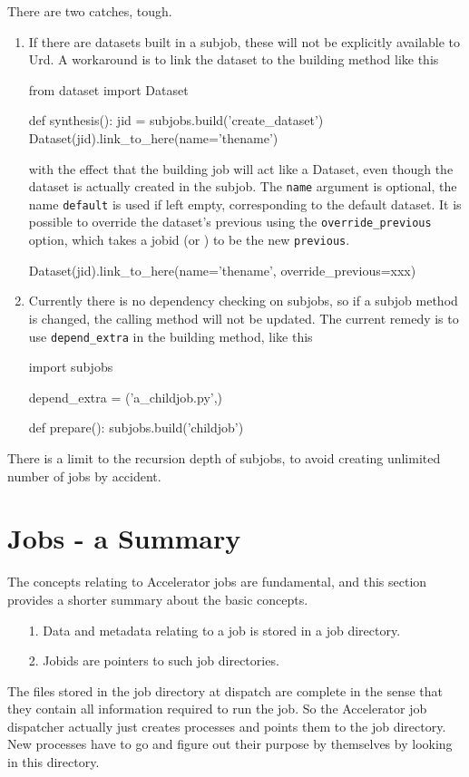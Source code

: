 There are two catches, tough.
\begin{enumerate}
  \item
If there are datasets built in a subjob,
these will not be explicitly available to Urd.  A workaround is to
link the dataset to the building method like this
\begin{python}
from dataset import Dataset

def synthesis():
    jid = subjobs.build('create_dataset')
    Dataset(jid).link_to_here(name='thename')
\end{python}
with the effect that the building job will act like a Dataset, even
though the dataset is actually created in the subjob.  The
\texttt{name} argument is optional, the name \texttt{default} is used
if left empty, corresponding to the default dataset.  It is possible
to override the dataset's previous using
the \texttt{override\_previous} option, which takes a jobid
(or \pyNone) to be the new \texttt{previous}.
\begin{python}
Dataset(jid).link_to_here(name='thename', override_previous=xxx)
\end{python}


\item
Currently there is no dependency checking on subjobs, so if a subjob
method is changed, the calling method will not be updated.  The
current remedy is to use \texttt{depend\_extra} in the building
method, like this
\begin{python}
import subjobs

depend_extra = ('a_childjob.py',)

def prepare():
    subjobs.build('childjob')
\end{python}
\end{enumerate}
There is a limit to the recursion depth of subjobs, to avoid creating
unlimited number of jobs by accident.




\section{Jobs - a Summary}
The concepts relating to Accelerator jobs are fundamental, and this
section provides a shorter summary about the basic concepts.

\begin{itemize}
\item[1.]  Data and metadata relating to a job is stored in a
job directory.
\item[2.]  Jobids are pointers to such job directories.
\end{itemize}
The files stored in the job directory at dispatch are complete in the
sense that they contain all information required to run the job.  So
the Accelerator job dispatcher actually just creates processes and
points them to the job directory.  New processes have to go and figure
out their purpose by themselves by looking in this directory.

